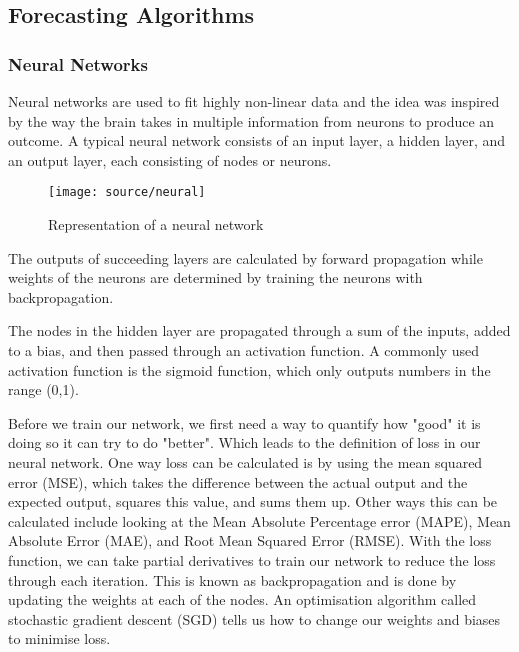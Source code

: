 \documentclass[12pt,twocolumn]{article}
\begin{document}
		\subsection{Forecasting Algorithms}

			\subsubsection*{Neural Networks}
				\quad Neural networks are used to fit highly non-linear data and the idea was inspired by the way the brain takes in multiple information from neurons to produce an outcome. A typical neural network consists of an input layer, a hidden layer, and an output layer, each consisting of nodes or neurons. 

				\begin{figure}[!htbp]
					\centering
					\texttt{[image: source/neural]}
					\caption{Representation of a neural network}
				\end{figure}

				The outputs of succeeding layers are calculated by forward propagation while weights of the neurons are determined by training the neurons with backpropagation. \newline

				The nodes in the hidden layer are propagated through a sum of the inputs, added to a bias, and then passed through an activation function. A commonly used activation function is the sigmoid function, which only outputs numbers in the range (0,1). \newline

				\quad Before we train our network, we first need a way to quantify how "good" it is doing so it can try to do "better". Which leads to the definition of loss in our neural network. One way loss can be calculated is by using the mean squared error (MSE), which takes the difference between the actual output and the expected output, squares this value, and sums them up. Other ways this can be calculated include looking at the Mean Absolute Percentage error (MAPE), Mean Absolute Error (MAE), and Root Mean Squared Error (RMSE). With the loss function, we can take partial derivatives to train our network to reduce the loss through each iteration. This is known as backpropagation and is done by updating the weights at each of the nodes. An optimisation algorithm called stochastic gradient descent (SGD) tells us how to change our weights and biases to minimise loss. \newline
\end{document}
